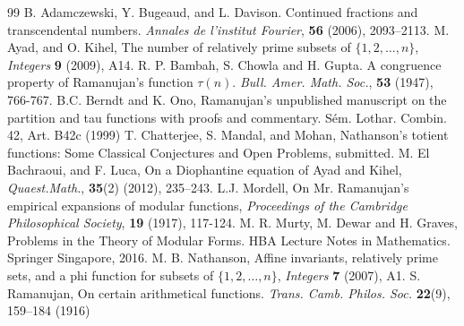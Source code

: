 \documentclass[12pt,reqno]{amsart}
\begin{document}
\begin{thebibliography}{99}
 B. Adamczewski, Y. Bugeaud, and L. Davison. Continued fractions and
transcendental numbers. \textit{Annales de l’institut Fourier}, \textbf{56} (2006), 2093–2113.
 M. Ayad, and O. Kihel, The number of relatively prime subsets of $\{1,2,\ldots,n\}$, \textit{Integers} \textbf{9} (2009), A14.
 R. P. Bambah, S. Chowla and H. Gupta. A congruence property of Ramanujan's function $\tau(n)$. \textit{Bull. Amer. Math. Soc.}, \textbf{53} (1947), 766-767.
 B.C. Berndt and K. Ono, Ramanujan’s unpublished manuscript on the partition and tau functions with proofs and commentary. Sém. Lothar. Combin. 42, Art. B42c (1999)
 T. Chatterjee, S. Mandal, and Mohan, Nathanson's totient functions: Some Classical Conjectures and Open Problems, submitted.
 M. El Bachraoui, and F. Luca, On a Diophantine equation of Ayad and Kihel, \textit{Quaest.Math.}, \textbf{35}(2) (2012), 235–243.
 L.J. Mordell, On Mr. Ramanujan’s empirical expansions of modular functions, \textit{Proceedings of the Cambridge Philosophical Society}, \textbf{19} (1917), 117-124.
 M. R. Murty, M. Dewar and H. Graves, Problems in the Theory of Modular Forms. HBA Lecture Notes in Mathematics. Springer Singapore, 2016.
 M. B. Nathanson, Affine invariants, relatively prime sets, and a phi function for subsets of $\{1,2,\dots,n\}$, \textit{Integers} \textbf{7} (2007), A1.
 S. Ramanujan, On certain arithmetical functions. \textit{Trans. Camb. Philos. Soc.} \textbf{22}(9), 159–184 (1916)





\end{thebibliography}
\end{document}
